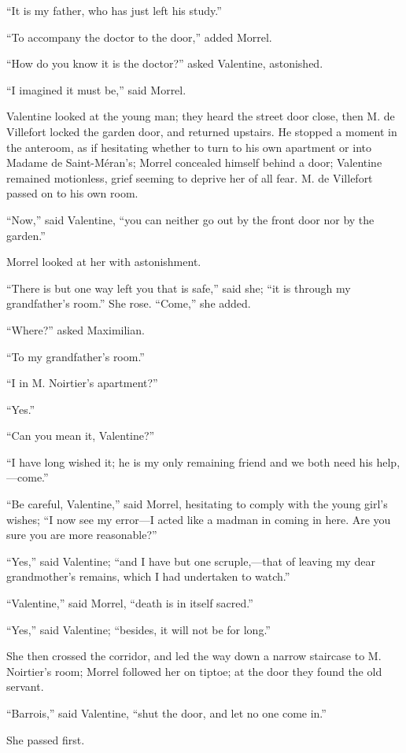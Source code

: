 “It is my father, who has just left his study.”

“To accompany the doctor to the door,” added Morrel.

“How do you know it is the doctor?” asked Valentine, astonished.

“I imagined it must be,” said Morrel.

Valentine looked at the young man; they heard the street door close,
then M. de Villefort locked the garden door, and returned upstairs. He
stopped a moment in the anteroom, as if hesitating whether to turn to
his own apartment or into Madame de Saint-Méran’s; Morrel concealed
himself behind a door; Valentine remained motionless, grief seeming to
deprive her of all fear. M. de Villefort passed on to his own room.

“Now,” said Valentine, “you can neither go out by the front door nor by
the garden.”

Morrel looked at her with astonishment.

“There is but one way left you that is safe,” said she; “it is through
my grandfather’s room.” She rose. “Come,” she added.

“Where?” asked Maximilian.

“To my grandfather’s room.”

“I in M. Noirtier’s apartment?”

“Yes.”

“Can you mean it, Valentine?”

“I have long wished it; he is my only remaining friend and we both need
his help,—come.”

“Be careful, Valentine,” said Morrel, hesitating to comply with the
young girl’s wishes; “I now see my error—I acted like a madman in
coming in here. Are you sure you are more reasonable?”

“Yes,” said Valentine; “and I have but one scruple,—that of leaving my
dear grandmother’s remains, which I had undertaken to watch.”

“Valentine,” said Morrel, “death is in itself sacred.”

“Yes,” said Valentine; “besides, it will not be for long.”

She then crossed the corridor, and led the way down a narrow staircase
to M. Noirtier’s room; Morrel followed her on tiptoe; at the door they
found the old servant.

“Barrois,” said Valentine, “shut the door, and let no one come in.”

She passed first.

